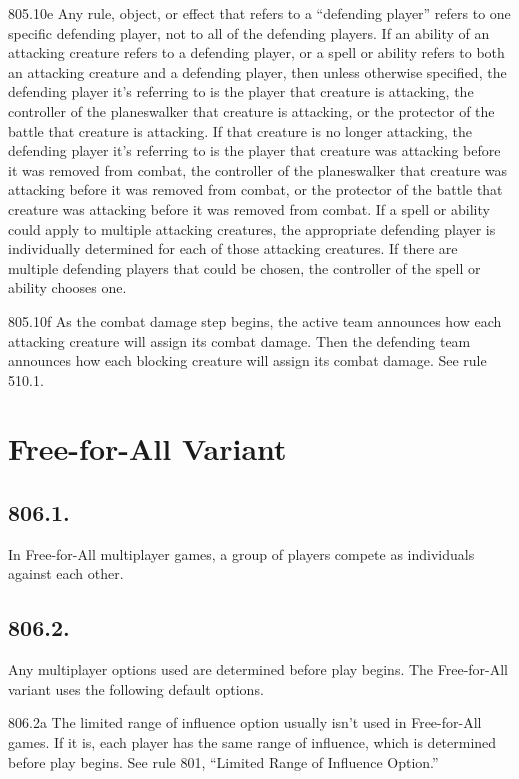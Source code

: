 805.10e Any rule, object, or effect that refers to a “defending player” refers to one specific defending player, not to all of the defending players. If an ability of an attacking creature refers to a defending player, or a spell or ability refers to both an attacking creature and a defending player, then unless otherwise specified, the defending player it’s referring to is the player that creature is attacking, the controller of the planeswalker that creature is attacking, or the protector of the battle that creature is attacking. If that creature is no longer attacking, the defending player it’s referring to is the player that creature was attacking before it was removed from combat, the controller of the planeswalker that creature was attacking before it was removed from combat, or the protector of the battle that creature was attacking before it was removed from combat. If a spell or ability could apply to multiple attacking creatures, the appropriate defending player is individually determined for each of those attacking creatures. If there are multiple defending players that could be chosen, the controller of the spell or ability chooses one.

805.10f As the combat damage step begins, the active team announces how each attacking creature will assign its combat damage. Then the defending team announces how each blocking creature will assign its combat damage. See rule 510.1.

\section{Free-for-All Variant}
\subsection*{806.1.}
In Free-for-All multiplayer games, a group of players compete as individuals against each other.

\subsection*{806.2.}
Any multiplayer options used are determined before play begins. The Free-for-All variant uses the following default options.

806.2a The limited range of influence option usually isn’t used in Free-for-All games. If it is, each player has the same range of influence, which is determined before play begins. See rule 801, “Limited Range of Influence Option.”

